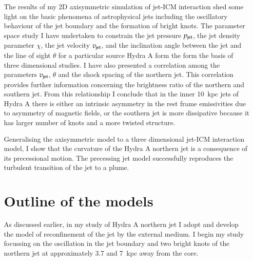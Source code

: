 
The results of my 2D axisymmetric simulation of jet-ICM interaction shed some light on the basic phenomena of astrophysical jets including the oscillatory behaviour of the jet boundary and the formation of bright knots. The parameter space study I have undertaken to constrain the jet pressure $p_{\rm jet}$, the jet density parameter $\chi$, the jet velocity $v_{\rm jet}$, and the inclination angle between the jet and the line of sight $\theta$ for a particular source Hydra A form the form the basis of three dimensional studies. I have also presented a correlation among the parameters $v_{\rm jet}$, $\theta$ and the shock spacing of the northern jet. This correlation provides further information concerning the brightness ratio of the northern and southern jet. From this relationship I conclude that in the inner 10~kpc jets of Hydra A there is either an intrinsic asymmetry in the rest frame emissivities due to asymmetry of magnetic fields, or the southern jet is more dissipative because it has larger number of knots and a more twisted structure. 

Generalising the axisymmetric model to a three dimensional jet-ICM interaction model, I show that the curvature of the Hydra A northern jet is a consequence of its precessional motion. The precessing jet model successfully reproduces the turbulent transition of the jet to a plume. 

\section{Outline of the models}\label{int:mod}
As discussed earlier, in my study of Hydra A northern jet I adopt and develop the model of reconfinement of the jet by the external medium. I begin my study focussing on the oscillation in the jet boundary and two bright knots of the northern jet at approximately 3.7 and 7~kpc away from the core. 
